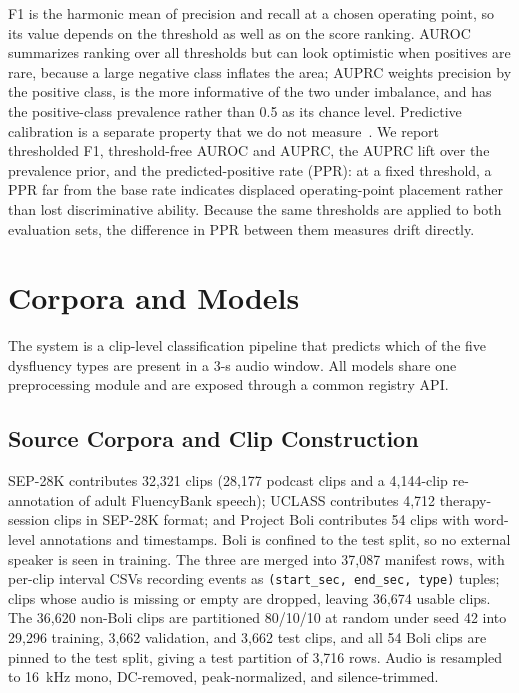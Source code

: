 \documentclass[a4paper,orivec]{llncs}
\begin{document}
F1 is the harmonic mean of precision and recall at a chosen operating point, so
its value depends on the threshold as well as on the score ranking. AUROC
summarizes ranking over all thresholds but can look optimistic when positives are
rare, because a large negative class inflates the area; AUPRC weights precision by
the positive class, is the more informative of the two under imbalance, and has
the positive-class prevalence rather than 0.5 as its chance level. Predictive
calibration is a separate property that we do not measure~\cite{guo2017calibration}.
We report thresholded F1, threshold-free AUROC and AUPRC, the AUPRC lift over the
prevalence prior, and the predicted-positive rate (PPR): at a fixed threshold, a
PPR far from the base rate indicates displaced operating-point placement rather
than lost discriminative ability. Because the same thresholds are applied to both
evaluation sets, the difference in PPR between them measures drift directly.

\section{Corpora and Models}
\label{sec:arch}

The system is a clip-level classification pipeline that predicts which of the
five dysfluency types are present in a 3-s audio window. All models share one
preprocessing module and are exposed through a common registry API.

\subsection{Source Corpora and Clip Construction}
SEP-28K contributes 32{,}321 clips (28{,}177 podcast clips and a 4{,}144-clip
re-annotation of adult FluencyBank speech); UCLASS contributes 4{,}712
therapy-session clips in SEP-28K format; and Project Boli contributes 54 clips
with word-level annotations and timestamps. Boli is confined to the test split,
so no external speaker is seen in training. The three are merged into 37{,}087
manifest rows, with per-clip interval CSVs recording events as
\texttt{(start\_sec, end\_sec, type)} tuples; clips whose audio is missing or
empty are dropped, leaving 36{,}674 usable clips. The 36{,}620 non-Boli clips are
partitioned 80/10/10 at random under seed 42 into 29{,}296 training, 3{,}662
validation, and 3{,}662 test clips, and all 54 Boli clips are pinned to the test
split, giving a test partition of 3{,}716 rows. Audio is resampled to 16~kHz
mono, DC-removed, peak-normalized, and silence-trimmed.
\end{document}
